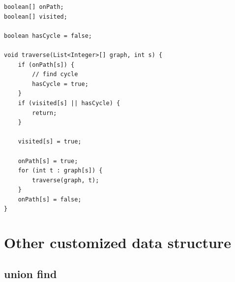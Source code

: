 \documentclass[a4paper,11pt,twoside]{book}
\begin{document}
\begin{itemize}
\begin{lstlisting}
boolean[] onPath;
boolean[] visited;

boolean hasCycle = false;

void traverse(List<Integer>[] graph, int s) {
	if (onPath[s]) {
		// find cycle
		hasCycle = true;
	}
	if (visited[s] || hasCycle) {
		return;
	}

	visited[s] = true;

	onPath[s] = true;
	for (int t : graph[s]) {
		traverse(graph, t);
	}
	onPath[s] = false;
}
\end{lstlisting}

\end{itemize}

\section{Other customized data structure}

\subsection{union find}
\end{document}
